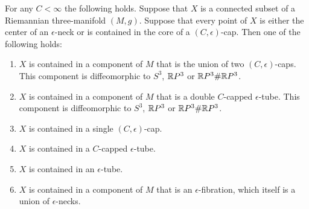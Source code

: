 \begin{proposition}
\label{prop:connected-set-in-caps-and-necks}
\label{Xcontainedin}

For any $C<\infty$ the following holds. Suppose that $X$ is a
connected subset of a Riemannian three-manifold $(M,g)$. Suppose
that every point of $X$ is either the center of an $\epsilon$-neck
or is contained in the core of a $(C,\epsilon)$-cap. Then one of the
following holds:
\begin{enumerate}
\item[(1)] $X$ is contained in a component of $M$ that is the union of
two $(C,\epsilon)$-caps. This component is diffeomorphic to $S^3$,
$\mathbb{R} P^3$ or $\mathbb{R} P^3\#\mathbb{R} P^3$.
\item[(2)] $X$ is contained in a component of $M$ that is a double $C$-capped $\epsilon$-tube.
 This component is diffeomorphic to $S^3$, $\mathbb{R} P^3$ or $\mathbb{R}
P^3\#\mathbb{R} P^3$.
\item[(3)] $X$ is contained in a single $(C,\epsilon)$-cap.
\item[(4)] $X$ is contained in a $C$-capped $\epsilon$-tube.
\item[(5)] $X$ is contained in an $\epsilon$-tube.
\item[(6)] $X$ is contained in a component of $M$ that is an
$\epsilon$-fibration, which itself is a union of $\epsilon$-necks.
\end{enumerate}
\end{proposition}


